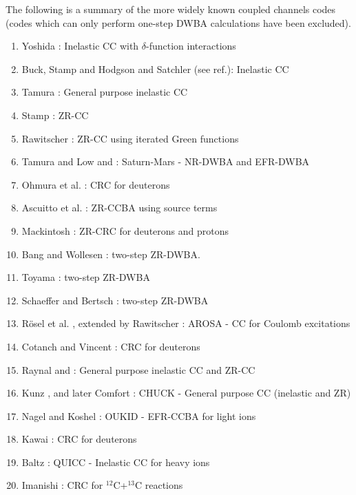 \documentclass[11pt,a4paper]{article}
\begin{document}
The following is a summary of the more widely known coupled channels
codes (codes which can only perform one-step DWBA calculations have
been excluded).
\begin{enumerate}
\itemsep=-2pt
\item Yoshida \cite{YOSH}: Inelastic CC with $\delta$-function interactions
\item Buck, Stamp and Hodgson \cite{BSH} and Satchler (see ref.\cite{BSH}): Inelastic CC
\item Tamura \cite{TAM65}: General purpose inelastic CC
\item Stamp \cite{APS}: ZR-CC
\item Rawitscher \cite{RAWIT}: ZR-CC using iterated Green functions
\item Tamura and Low \cite{SM1} and \cite{TUM}: Saturn-Mars - NR-DWBA and EFR-DWBA
\item Ohmura et al. \cite{OHMURA}: CRC for deuterons
\item Ascuitto et al. \cite{asc}: ZR-CCBA using source terms
\item Mackintosh \cite{RMA}: ZR-CRC for deuterons and protons
\item Bang and Wollesen \cite{Bang}: two-step ZR-DWBA.
\item Toyama \cite{Toyama}: two-step ZR-DWBA
\item Schaeffer and Bertsch \cite{SCHB}: two-step ZR-DWBA
\item R\"osel et al. \cite{AROSA}, extended by Rawitscher \cite{AROSA2}:
AROSA - CC for Coulomb excitations
\item Cotanch and Vincent \cite{CV}: CRC for deuterons
\item Raynal \cite{ECIS1} and \cite{ECIS2}:
General purpose inelastic CC and ZR-CC
\item Kunz \cite{CHUCK}, and later Comfort \cite{CHUCK3}:
CHUCK - General purpose CC (inelastic and ZR)
\item Nagel and Koshel \cite{OUKID}: OUKID - EFR-CCBA for light ions
\item Kawai \cite{KAWAI}: CRC for deuterons
\item Baltz \cite{QUICC}: QUICC - Inelastic CC for heavy ions
\item Imanishi \cite{C13}: CRC for $^{12}$C+$^{13}$C reactions

\end{enumerate}
\end{document}
